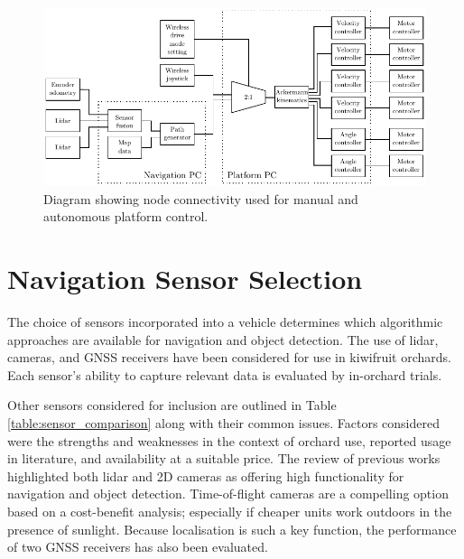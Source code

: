 \documentclass[preprint,authoryear,12pt]{elsarticle}
\begin{document}
        \begin{figure}[htb]
            \centering
            \includegraphics[width=\linewidth]{imgs/system_diagram/software_v2.pdf}
            \caption{Diagram showing node connectivity used for manual and autonomous platform control.}
            \label{fig:system_diagram_software}
        \end{figure}



\section{Navigation Sensor Selection}
\label{sect:sensors}
    The choice of sensors incorporated into a vehicle determines which algorithmic approaches are available for navigation and object detection.
    The use of lidar, cameras, and GNSS receivers have been considered for use in kiwifruit orchards.
    Each sensor's ability to capture relevant data is evaluated by in-orchard trials.

    Other sensors considered for inclusion are outlined in Table \ref{table:sensor_comparison} along with their common issues.
    Factors considered were the strengths and weaknesses in the context of orchard use, reported usage in literature, and availability at a suitable price.
    The review of previous works highlighted both lidar and 2D cameras as offering high functionality for navigation and object detection.
    Time-of-flight cameras are a compelling option based on a cost-benefit analysis; especially if cheaper units work outdoors in the presence of sunlight.
    Because localisation is such a key function, the performance of two GNSS receivers has also been evaluated.
\end{document}
